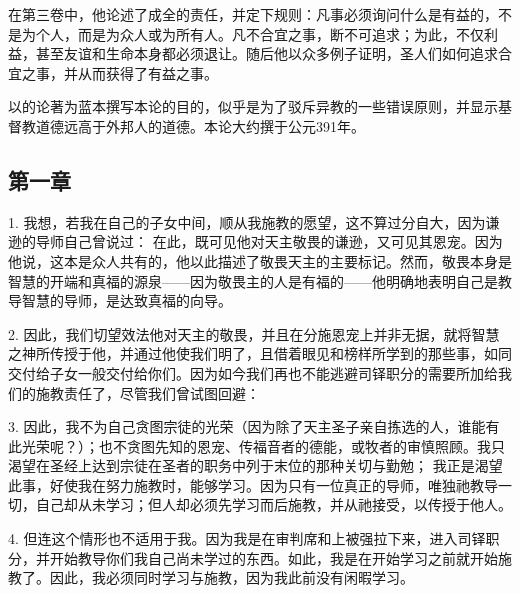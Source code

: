 在第三卷中，他论述了成全的责任，并定下规则：凡事必须询问什么是有益的，不是为个人，而是为众人或为所有人。凡不合宜之事，断不可追求；为此，不仅利益，甚至友谊和生命本身都必须退让。随后他以众多例子证明，圣人们如何追求合宜之事，并从而获得了有益之事。\par

以的论著为蓝本撰写本论的目的，似乎是为了驳斥异教的一些错误原则，并显示基督教道德远高于外邦人的道德。本论大约撰于公元391年。\par


\subsection{第一章}

\par

1. 我想，若我在自己的子女中间，顺从我施教的愿望，这不算过分自大，因为谦逊的导师自己曾说过： 在此，既可见他对天主敬畏的谦逊，又可见其恩宠。因为他说，这本是众人共有的，他以此描述了敬畏天主的主要标记。然而，敬畏本身是智慧的开端和真福的源泉——因为敬畏主的人是有福的——他明确地表明自己是教导智慧的导师，是达致真福的向导。\par

2. 因此，我们切望效法他对天主的敬畏，并且在分施恩宠上并非无据，就将智慧之神所传授于他，并通过他使我们明了，且借着眼见和榜样所学到的那些事，如同交付给子女一般交付给你们。因为如今我们再也不能逃避司铎职分的需要所加给我们的施教责任了，尽管我们曾试图回避：\par

3. 因此，我不为自己贪图宗徒的光荣（因为除了天主圣子亲自拣选的人，谁能有此光荣呢？）；也不贪图先知的恩宠、传福音者的德能，或牧者的审慎照顾。我只渴望在圣经上达到宗徒在圣者的职务中列于末位的那种关切与勤勉； 我正是渴望此事，好使我在努力施教时，能够学习。因为只有一位真正的导师，唯独祂教导一切，自己却从未学习；但人却必须先学习而后施教，并从祂接受，以传授于他人。\par

4. 但连这个情形也不适用于我。因为我是在审判席和上被强拉下来，进入司铎职分，并开始教导你们我自己尚未学过的东西。如此，我是在开始学习之前就开始施教了。因此，我必须同时学习与施教，因为我此前没有闲暇学习。\par

